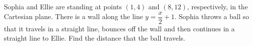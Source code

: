 Sophia and Ellie are standing at points $(1,4)$ and $(8,12)$, respectively, in the Cartesian plane. There is a wall along the line $y=\dfrac{x}{2}+1$. Sophia throws a ball so that it travels in a straight line, bounces off the wall and then continues in a straight line to Ellie. Find the distance that the ball travels.
